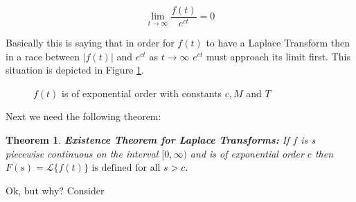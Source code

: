 \documentclass{article}
\newtheorem{thm}{Theorem}[section]
\theoremstyle{definition}
\begin{document}
\bigskip
\begin{equation*}
\lim\limits_{t \to \infty} \frac{f(t)}{e^{ct}} = 0
\end{equation*}

\medskip
\bigskip
\noindent
Basically this is saying that in order for $f(t)$ to have a Laplace Transform then in a race between $|f(t)|$ and $e^{ct}$ as $t \to \infty$ $e^{ct}$ must
approach its limit first. This situation is depicted in Figure \ref{fig:exponential_order}.

\begin{figure}[H]
\caption{$f(t)$ is of exponential order with constants $c, M$ and $T$}
\label{fig:exponential_order}
\end{figure}

\bigskip
\noindent
Next we need the following theorem:

\bigskip
\begin{thm} 
{\bf Existence Theorem for Laplace Transforms:} 
\normalfont If $f$ is s piecewise continuous on the interval $[0,\infty)$ and is of exponential order $c$ then 
$F (s) = \mathcal{L}\{f (t)\} \text{ is defined for all $s > c$}.$
\end{thm}

\bigskip
\noindent
Ok, but why? Consider
\end{document}
